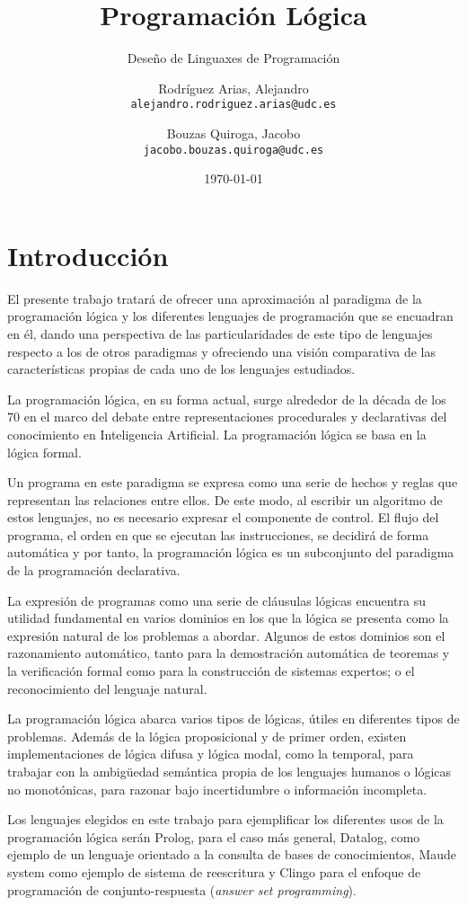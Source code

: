 \documentclass[11pt,captions=nooneline,DIV=14, parskip=full]{scrartcl}
\title{Programación Lógica}
\subtitle{Deseño de Linguaxes de Programación}
\author{\small Rodríguez Arias, Alejandro\\
	\small \texttt{alejandro.rodriguez.arias@udc.es}
	\and \small Bouzas Quiroga, Jacobo\\
	\small \texttt{jacobo.bouzas.quiroga@udc.es}}
\date{\small \today}
\begin{document}
\maketitle
\clearpage
\tableofcontents
\clearpage

\section{Introducción}
\label{sec:intro}

El presente trabajo tratará de ofrecer una aproximación al paradigma de la programación lógica y los diferentes lenguajes de programación que se encuadran en él, dando una perspectiva de las particularidades de este tipo de lenguajes respecto a los de otros paradigmas y ofreciendo una visión comparativa de las características propias de cada uno de los lenguajes estudiados.

La programación lógica, en su forma actual, surge alrededor de la década de los 70 en el marco del debate entre representaciones procedurales y declarativas del conocimiento en Inteligencia Artificial. La programación lógica se basa en la lógica formal.

Un programa en este paradigma se expresa como una serie de hechos y reglas que representan las relaciones entre ellos. De este modo, al escribir un algoritmo de estos lenguajes, no es necesario expresar el componente de control. El flujo del programa, el orden en que se ejecutan las instrucciones, se decidirá de forma automática y por tanto, la programación lógica es un subconjunto del paradigma de la programación declarativa.

La expresión de programas como una serie de cláusulas lógicas encuentra su utilidad fundamental en varios dominios en los que la lógica se presenta como la expresión natural de los problemas a abordar. Algunos de estos dominios son el razonamiento automático, tanto para la demostración automática de teoremas y la verificación formal como para la construcción de sistemas expertos; o el reconocimiento del lenguaje natural.

La programación lógica abarca varios tipos de lógicas, útiles en diferentes tipos de problemas. Además de la lógica proposicional y de primer orden, existen implementaciones de lógica difusa y lógica modal, como la temporal, para trabajar con la ambigüedad semántica propia de los lenguajes humanos o lógicas no monotónicas, para razonar bajo incertidumbre o información incompleta.

Los lenguajes elegidos en este trabajo para ejemplificar los diferentes usos de la programación lógica serán Prolog, para el caso más general, Datalog, como ejemplo de un lenguaje orientado a la consulta de bases de conocimientos, Maude system como ejemplo de sistema de reescritura y Clingo para el enfoque de programación de conjunto-respuesta (\textit{answer set programming}).
\end{document}
